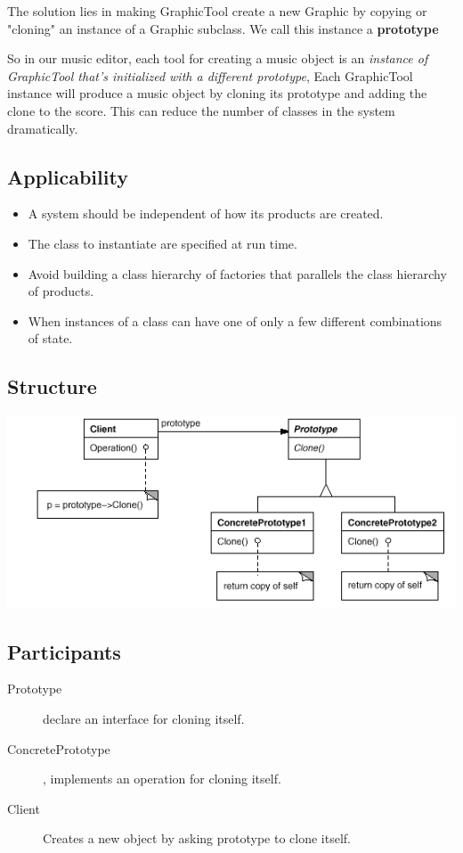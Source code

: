 \documentclass[11pt, a4paper]{book}
\begin{document}
The solution lies in making GraphicTool create a new Graphic by copying or
"cloning" an instance of a Graphic subclass. We call this instance a
\textbf{prototype} 

So in our music editor, each tool for creating a music object is an
\emph{instance of GraphicTool that's initialized with a different prototype},
Each GraphicTool instance will produce a music object by cloning its prototype
and adding the clone to the score. This can reduce the number of classes in the
system dramatically.

\subsection{Applicability}
\begin{itemize}
    \item A system should be independent of how its products are created.
    \item The class to instantiate are specified at run time.
    \item Avoid building a class hierarchy of factories that parallels the class
        hierarchy of products.
    \item When instances of a class can have one of only a few different
        combinations of state.
\end{itemize}
\subsection{Structure}
\includegraphics{Proto_stru}
\subsection{Participants}
\begin{description}
    \item [Prototype] declare an interface for cloning itself.
    \item [ConcretePrototype], implements an operation for cloning itself.
    \item [Client] Creates a new object by asking prototype to clone itself.
\end{description}
\end{document}
